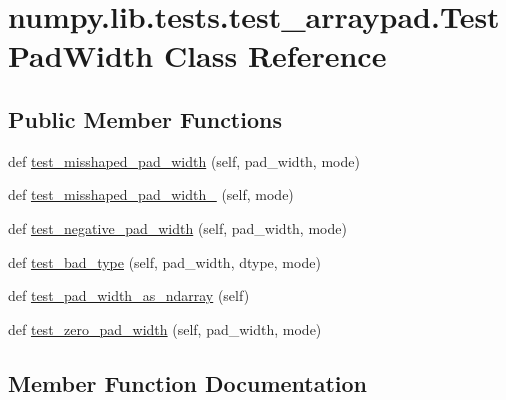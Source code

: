 \hypertarget{classnumpy_1_1lib_1_1tests_1_1test__arraypad_1_1TestPadWidth}{}\section{numpy.\+lib.\+tests.\+test\+\_\+arraypad.\+Test\+Pad\+Width Class Reference}
\label{classnumpy_1_1lib_1_1tests_1_1test__arraypad_1_1TestPadWidth}
\subsection*{Public Member Functions}
\begin{DoxyCompactItemize}
\item 
def \hyperlink{classnumpy_1_1lib_1_1tests_1_1test__arraypad_1_1TestPadWidth_afd9bdea76c5dd93d5de5bb30c93bd12b}{test\+\_\+misshaped\+\_\+pad\+\_\+width} (self, pad\+\_\+width, mode)
\item 
def \hyperlink{classnumpy_1_1lib_1_1tests_1_1test__arraypad_1_1TestPadWidth_adec7e57d27ee66c41d585dffdee26419}{test\+\_\+misshaped\+\_\+pad\+\_\+width\+\_} (self, mode)
\item 
def \hyperlink{classnumpy_1_1lib_1_1tests_1_1test__arraypad_1_1TestPadWidth_a0216717bb46779bd29ff9ef7a818ceb4}{test\+\_\+negative\+\_\+pad\+\_\+width} (self, pad\+\_\+width, mode)
\item 
def \hyperlink{classnumpy_1_1lib_1_1tests_1_1test__arraypad_1_1TestPadWidth_a4e1604780de8e5561bf66a65efb65041}{test\+\_\+bad\+\_\+type} (self, pad\+\_\+width, dtype, mode)
\item 
def \hyperlink{classnumpy_1_1lib_1_1tests_1_1test__arraypad_1_1TestPadWidth_a1764bfd1d93623afb920d69a416a7893}{test\+\_\+pad\+\_\+width\+\_\+as\+\_\+ndarray} (self)
\item 
def \hyperlink{classnumpy_1_1lib_1_1tests_1_1test__arraypad_1_1TestPadWidth_a4300d5bf7e6b05893b54c10ad5482b5a}{test\+\_\+zero\+\_\+pad\+\_\+width} (self, pad\+\_\+width, mode)
\end{DoxyCompactItemize}


\subsection{Member Function Documentation}
\mbox{\label{classnumpy_1_1lib_1_1tests_1_1test__arraypad_1_1TestPadWidth_a4e1604780de8e5561bf66a65efb65041}} 
